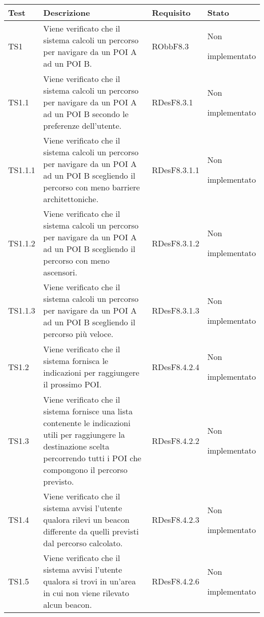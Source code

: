 \documentclass[../PianoDiQualifica.tex]{subfiles}
\begin{document}
\begin{appendices}
	\begin{longtabu} to \textwidth {X[0.7] X[2] X[1.3] X}
\toprule
\textbf{Test} & \textbf{Descrizione} & \textbf{Requisito} & \textbf{Stato}\\
\midrule
\endhead
{}
TS1 & Viene verificato che il sistema calcoli un percorso per navigare da un POI A ad un POI B. & RObbF8.3 & Non \par implementato \\ 
\midrule 
TS1.1 & Viene verificato che il sistema calcoli un percorso per navigare da un POI A ad un POI B secondo le preferenze dell'utente. & RDesF8.3.1 & Non \par implementato \\ 
\midrule 
TS1.1.1 & Viene verificato che il sistema calcoli un percorso per navigare da un POI A ad un POI B scegliendo il percorso con meno barriere architettoniche. & RDesF8.3.1.1 & Non \par implementato \\ 
\midrule 
TS1.1.2 & Viene verificato che il sistema calcoli un percorso per navigare da un POI A ad un POI B scegliendo il percorso con meno ascensori. & RDesF8.3.1.2 & Non \par implementato \\ 
\midrule 
TS1.1.3 & Viene verificato che il sistema calcoli un percorso per navigare da un POI A ad un POI B scegliendo il percorso più veloce. & RDesF8.3.1.3 & Non \par implementato \\ 
\midrule 
TS1.2 & Viene verificato che il sistema fornisca le indicazioni per raggiungere il prossimo POI. & RDesF8.4.2.4 & Non \par implementato \\ 
\midrule 
TS1.3 & Viene verificato che il sistema fornisce una lista contenente le indicazioni utili per raggiungere la destinazione scelta percorrendo tutti i POI che compongono il percorso previsto. & RDesF8.4.2.2 & Non \par implementato \\ 
\midrule 
TS1.4 & Viene verificato che il sistema avvisi l'utente qualora rilevi un beacon differente da quelli previsti dal percorso calcolato. & RDesF8.4.2.3 & Non \par implementato \\ 
\midrule 
TS1.5 & Viene verificato che il sistema avvisi l'utente qualora si trovi in un'area in cui non viene rilevato alcun beacon. & RDesF8.4.2.6 & Non \par implementato \\ 

\end{longtabu}
\end{appendices}
\end{document}
